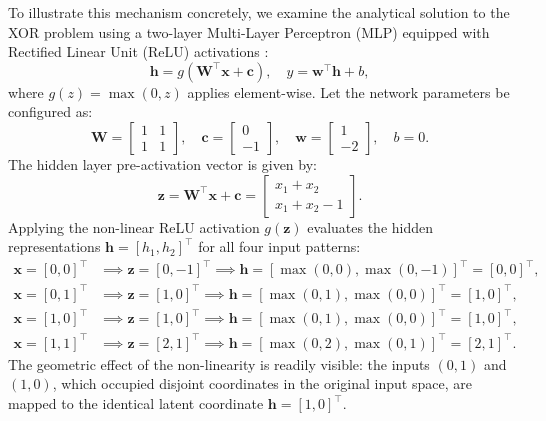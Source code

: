 \documentclass[../../../main.tex]{subfiles}
\begin{document}
To illustrate this mechanism concretely, we examine the analytical solution to the XOR problem using a two-layer Multi-Layer Perceptron (MLP) equipped with Rectified Linear Unit ($\text{ReLU}$) activations \citep{goodfellow2016}:
\begin{equation}
\mathbf{h} = g\left(\mathbf{W}^\top \mathbf{x} + \mathbf{c}\right), \quad y = \mathbf{w}^\top \mathbf{h} + b,
\end{equation}
where $g(z) = \max(0, z)$ applies element-wise. Let the network parameters be configured as:
\begin{equation}
\mathbf{W} = \begin{bmatrix} 1 & 1 \\ 1 & 1 \end{bmatrix}, \quad \mathbf{c} = \begin{bmatrix} 0 \\ -1 \end{bmatrix}, \quad \mathbf{w} = \begin{bmatrix} 1 \\ -2 \end{bmatrix}, \quad b = 0.
\end{equation}
The hidden layer pre-activation vector is given by:
\begin{equation}
\mathbf{z} = \mathbf{W}^\top \mathbf{x} + \mathbf{c} = \begin{bmatrix} x_1 + x_2 \\ x_1 + x_2 - 1 \end{bmatrix}.
\end{equation}
Applying the non-linear ReLU activation $g(\mathbf{z})$ evaluates the hidden representations $\mathbf{h} = [h_1, h_2]^\top$ for all four input patterns:
\begin{align}
\mathbf{x} = [0, 0]^\top &\implies \mathbf{z} = [0, -1]^\top \implies \mathbf{h} = [\max(0, 0), \max(0, -1)]^\top = [0, 0]^\top, \\
\mathbf{x} = [0, 1]^\top &\implies \mathbf{z} = [1, 0]^\top \implies \mathbf{h} = [\max(0, 1), \max(0, 0)]^\top = [1, 0]^\top, \\
\mathbf{x} = [1, 0]^\top &\implies \mathbf{z} = [1, 0]^\top \implies \mathbf{h} = [\max(0, 1), \max(0, 0)]^\top = [1, 0]^\top, \\
\mathbf{x} = [1, 1]^\top &\implies \mathbf{z} = [2, 1]^\top \implies \mathbf{h} = [\max(0, 2), \max(0, 1)]^\top = [2, 1]^\top.
\end{align}
The geometric effect of the non-linearity is readily visible: the inputs $(0,1)$ and $(1,0)$, which occupied disjoint coordinates in the original input space, are mapped to the identical latent coordinate $\mathbf{h} = [1, 0]^\top$.
\end{document}
